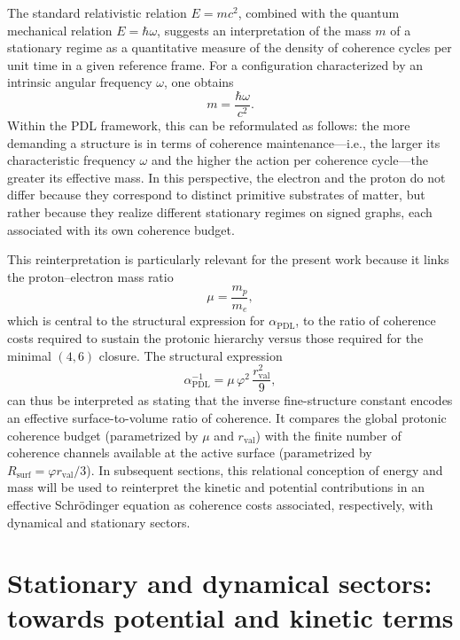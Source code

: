 \documentclass[11pt,a4paper]{article}
\begin{document}
The standard relativistic relation $E = mc^{2}$, combined with the quantum mechanical relation $E = \hbar\omega$, suggests an interpretation of the mass $m$ of a stationary regime as a quantitative measure of the density of coherence cycles per unit time in a given reference frame. For a configuration characterized by an intrinsic angular frequency $\omega$, one obtains
\begin{equation}
m = \frac{\hbar \omega}{c^{2}}.
\end{equation}
Within the PDL framework, this can be reformulated as follows: the more demanding a structure is in terms of coherence maintenance—i.e., the larger its characteristic frequency $\omega$ and the higher the action per coherence cycle—the greater its effective mass. In this perspective, the electron and the proton do not differ because they correspond to distinct primitive substrates of matter, but rather because they realize different stationary regimes on signed graphs, each associated with its own coherence budget.\par

This reinterpretation is particularly relevant for the present work because it links the proton–electron mass ratio
\begin{equation}
\mu = \frac{m_p}{m_e},
\end{equation}
which is central to the structural expression for $\alpha_{\mathrm{PDL}}$, to the ratio of coherence costs required to sustain the protonic hierarchy versus those required for the minimal $(4,6)$ closure. The structural expression
\begin{equation}
\alpha_{\mathrm{PDL}}^{-1} = \mu\,\varphi^{2}\,\frac{r_{\mathrm{val}}^{2}}{9},
\end{equation}
can thus be interpreted as stating that the inverse fine-structure constant encodes an effective surface-to-volume ratio of coherence. It compares the global protonic coherence budget (parametrized by $\mu$ and $r_{\mathrm{val}}$) with the finite number of coherence channels available at the active surface (parametrized by $R_{\mathrm{surf}} = \varphi r_{\mathrm{val}}/3$).\cite{Laubscher2026DerivationAlpha} In subsequent sections, this relational conception of energy and mass will be used to reinterpret the kinetic and potential contributions in an effective Schr\"odinger equation as coherence costs associated, respectively, with dynamical and stationary sectors.

\section{Stationary and dynamical sectors: towards potential and kinetic terms}
\label{sec:StatDyn}
\end{document}
